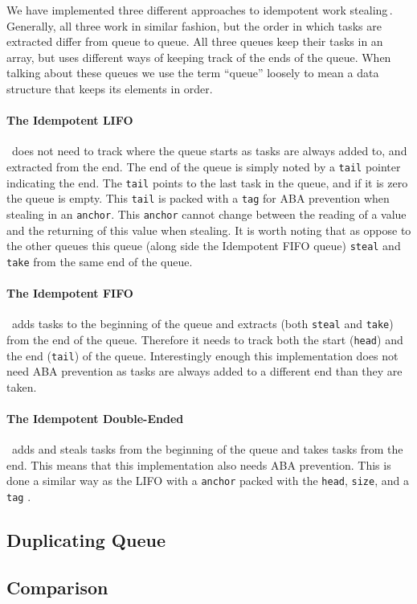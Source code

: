 We have implemented three different approaches to idempotent work stealing\,\cite{Michael:2009:IWS:1594835.1504186}. Generally, all three work in similar fashion, but the order in which tasks are extracted differ from queue to queue. All three queues keep their tasks in an array, but uses different ways of keeping track of the ends of the queue. When talking about these queues we use the term ``queue'' loosely to mean a data structure that keeps its elements in order.

\paragraph{The Idempotent LIFO}\,\cite[p. 47]{Michael:2009:IWS:1594835.1504186} does not need to track where the queue starts as tasks are always added to, and extracted from the end. The end of the queue is simply noted by a \texttt{tail} pointer indicating the end. The \texttt{tail} points to the last task in the queue, and if it is zero the queue is empty. This \texttt{tail} is packed with a \texttt{tag} for ABA prevention when stealing in an \texttt{anchor}. This \texttt{anchor} cannot change between the reading of a value and the returning of this value when stealing. It is worth noting that as oppose to the other queues this queue (along side the Idempotent FIFO queue) \texttt{steal} and \texttt{take} from the same end of the queue.

\paragraph{The Idempotent FIFO}\,\cite[p. 48]{Michael:2009:IWS:1594835.1504186}  adds tasks to the beginning of the queue and extracts (both \texttt{steal} and \texttt{take}) from the end of the queue. Therefore it needs to track both the start (\texttt{head}) and the end (\texttt{tail}) of the queue. Interestingly enough this implementation does not need ABA prevention as tasks are always added to a different end than they are taken.

\paragraph{The Idempotent Double-Ended} \,\cite[p. 49]{Michael:2009:IWS:1594835.1504186} adds and steals tasks from the beginning of the queue and takes tasks from the end. This means that this implementation also needs ABA prevention. This is done a similar way as the LIFO with a \texttt{anchor} packed with the \texttt{head}, \texttt{size}, and a \texttt{tag} .

\subsection{Duplicating Queue}

\subsection{Comparison}
